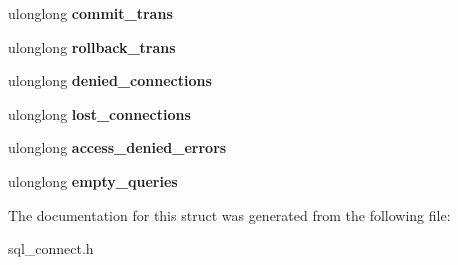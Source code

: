 \begin{DoxyCompactItemize}
\mbox{\label{structst__user__stats_a98d7a5f56204fab44cc2715f7fd1b792}} 
ulonglong {\bfseries commit\+\_\+trans}
\item 
\mbox{\label{structst__user__stats_aed3576543f27084b785afb47046c9a04}} 
ulonglong {\bfseries rollback\+\_\+trans}
\item 
\mbox{\label{structst__user__stats_a8f03e7e86962ac3038f4a90849907406}} 
ulonglong {\bfseries denied\+\_\+connections}
\item 
\mbox{\label{structst__user__stats_aed5f98a6a8db6f401abc88c488165cb7}} 
ulonglong {\bfseries lost\+\_\+connections}
\item 
\mbox{\label{structst__user__stats_ab15d6578c5533d78cbdeeef8bc12f152}} 
ulonglong {\bfseries access\+\_\+denied\+\_\+errors}
\item 
\mbox{\label{structst__user__stats_a8e74bd6360486e594e6f57ff3136f58e}} 
ulonglong {\bfseries empty\+\_\+queries}
\end{DoxyCompactItemize}


The documentation for this struct was generated from the following file\+:\begin{DoxyCompactItemize}
\item 
sql\+\_\+connect.\+h\end{DoxyCompactItemize}
